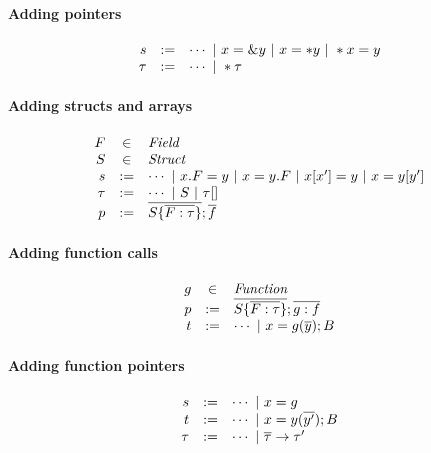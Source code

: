 \documentclass{article}[10pt]
\begin{document}
\paragraph{Adding pointers}

\[
  \begin{array}{@{}rcl@{}}
    s &:=& \cdots\ |\ x=\&y\ |\ x=*y\ |\ *x=y \\
    \tau &:=& \cdots\ |\ *\tau \\
  \end{array}
\]

\paragraph{Adding structs and arrays}

\[
  \begin{array}{@{}rcl@{}}
    F &\in& \mathit{Field} \\
    S &\in& \mathit{Struct} \\
    s &:=& \cdots\ |\ x.F=y\ |\ x=y.F\ |\ x[x']=y\ |\ x=y[y'] \\
    \tau &:=& \cdots\ |\ S\ |\ \tau[] \\
    p &:=& \overline{S \{ \overline{F:\tau} \}}; \overline{f} \\
  \end{array}
\]

\paragraph{Adding function calls}

\[
  \begin{array}{@{}rcl@{}}
    g &\in& \mathit{Function} \\
    p &:=& \overline{S \{ \overline{F:\tau} \}}; \overline{g:f} \\
    t &:=& \cdots\ |\ x=g(\overline{y}); B \\
  \end{array}
\]

\paragraph{Adding function pointers}

\[
  \begin{array}{@{}rcl@{}}
    s &:=& \cdots\ |\ x=g \\
    t &:=& \cdots\ |\ x=y(\overline{y'}); B \\
    \tau &:=& \cdots\ |\ \overline{\tau}\rightarrow\tau' \\
  \end{array}
\]
\end{document}
